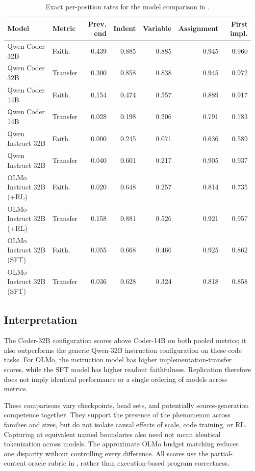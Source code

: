 \begin{table}[ht]\centering\scriptsize
\begin{tabular}{llrrrrr}\toprule
Model & Metric & Prev. end & Indent & Variable & Assignment & First impl.\\\midrule
Qwen Coder 32B & Faith. & 0.439 & 0.885 & 0.885 & 0.945 & 0.960 \\
Qwen Coder 32B & Transfer & 0.300 & 0.858 & 0.838 & 0.945 & 0.972 \\
Qwen Coder 14B & Faith. & 0.154 & 0.474 & 0.557 & 0.889 & 0.917 \\
Qwen Coder 14B & Transfer & 0.028 & 0.198 & 0.206 & 0.791 & 0.783 \\
Qwen Instruct 32B & Faith. & 0.000 & 0.245 & 0.071 & 0.636 & 0.589 \\
Qwen Instruct 32B & Transfer & 0.040 & 0.601 & 0.217 & 0.905 & 0.937 \\
OLMo Instruct 32B (+RL) & Faith. & 0.020 & 0.648 & 0.257 & 0.814 & 0.735 \\
OLMo Instruct 32B (+RL) & Transfer & 0.158 & 0.881 & 0.526 & 0.921 & 0.957 \\
OLMo Instruct 32B (SFT) & Faith. & 0.055 & 0.668 & 0.466 & 0.925 & 0.862 \\
OLMo Instruct 32B (SFT) & Transfer & 0.036 & 0.628 & 0.324 & 0.818 & 0.858 \\
\bottomrule\end{tabular}
\caption{Exact per-position rates for the model comparison in .}
\end{table}

\subsection{Interpretation}
The Coder-32B configuration scores above Coder-14B on both pooled metrics; it also outperforms the generic Qwen-32B instruction configuration on these code tasks. For OLMo, the instruction model has higher implementation-transfer scores, while the SFT model has higher readout faithfulness. Replication therefore does not imply identical performance or a single ordering of models across metrics.

These comparisons vary checkpoints, head sets, and potentially source-generation competence together. They support the presence of the phenomenon across families and sizes, but do not isolate causal effects of scale, code training, or RL. Capturing at equivalent named boundaries also need not mean identical tokenization across models. The approximate OLMo budget matching reduces one disparity without controlling every difference. All scores use the partial-content oracle rubric in , rather than execution-based program correctness.
